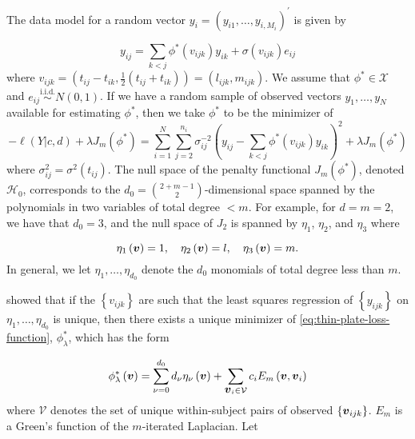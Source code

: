\documentclass[12pt]{article}
\newcommand{\Hilbert}{\mathcal{H}}
\newcommand{\bfv}{\mbox{\boldmath $v$}}
\theoremstyle{definition}
\begin{document}
\bigskip
The data model for a random vector $y_i = \left(y_{i1},\dots, y_{i,M_i} \right)^\prime$ is given by 

\begin{equation} \label{eq:functional-vc-ar-model}
y_{ij} = \sum_{k<j} \phi^*\left(v_{ijk}\right) y_{ik} + \sigma\left(v_{ijk}\right) e_{ij}
\end{equation}
\noindent
where $v_{ijk} = \left(t_{ij}-t_{ik}, \frac{1}{2}\left(t_{ij}+t_{ik}\right)\right) = \left(l_{ijk}, m_{ijk}\right)$. We assume that $\phi^* \in \mathcal{X}$ and $e_{ij} \stackrel{\text{i.i.d.}}{\sim} N\left(0,1\right)$. If we have a random sample of observed vectors $y_1,\dots,y_N$ available for estimating $\phi^*$, then we take $\phi^*$ to be the minimizer of
\begin{equation} \label{eq:thin-plate-loss-function}
-\ell\left(Y \vert c,d\right) + \lambda J_m\left(\phi^*\right) = \sum_{i=1}^N \sum_{j=2}^{n_i} \sigma^{-2}_{ij}\left( y_{ij} - \sum_{k<j} \phi^*\left(v_{ijk}\right) y_{ik}  \right)^2 + \lambda J_m \left( \phi^* \right)
\end{equation}
\noindent
where $\sigma^{2}_{ij} = \sigma^2\left(t_{ij}\right)$. The null space of the penalty functional $J_m \left( \phi^* \right)$, denoted $\Hilbert_0$, corresponds to the $d_0={2+m-1 \choose 2}$-dimensional space spanned by the polynomials in two variables of total degree $< m$. For example, for $d=m=2$, we have that $d_0=3$, and the null space of $J_2$ is spanned by $\eta_1$, $\eta_2$, and $\eta_3$ where

\[
\eta_1\left(\bfv\right) = 1,\quad \eta_2\left(\bfv\right) = l, \quad \eta_3\left(\bfv\right) = m.
\]
\noindent
In general, we let $\eta_1,\dots, \eta_{d_0}$ denote the $d_0$ monomials of total degree less than $m$.

\bigskip

\citet{duchon1977splines} showed that if the $\left\{ v_{ijk} \right\}$ are such that the least squares regression of $\left\{ y_{ijk}\right\}$ on $\eta_1,\dots, \eta_{d_0}$ is unique, then there exists a unique minimizer of \ref{eq:thin-plate-loss-function}, $\phi^*_\lambda$, which has the form

\begin{equation} \label{eq:unique-minimizer-of-loss}
\phi^*_\lambda\left( \bfv \right) = \sum_{\nu=0}^{d_0} d_\nu \eta_\nu \left( \bfv \right) + \sum_{\bfv_i \in \mathcal{V}} c_{i} E_m\left(\bfv,\bfv_i \right)
\end{equation}
\noindent
where $\mathcal{V}$ denotes the set of unique within-subject pairs of observed $\left\{ \bfv_{ijk} \right\}$. $E_m$ is a Green's function of the $m$-iterated Laplacian. Let
\end{document}
